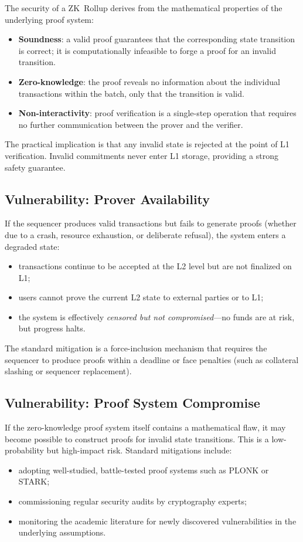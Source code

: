 The security of a ZK~Rollup derives from the mathematical properties of the underlying proof system:
\begin{itemize}
    \item \textbf{Soundness}: a valid proof guarantees that the corresponding state transition is correct; it is computationally infeasible to forge a proof for an invalid transition.
    \item \textbf{Zero-knowledge}: the proof reveals no information about the individual transactions within the batch, only that the transition is valid.
    \item \textbf{Non-interactivity}: proof verification is a single-step operation that requires no further communication between the prover and the verifier.
\end{itemize}

The practical implication is that any invalid state is rejected at the point of L1 verification. Invalid commitments never enter L1 storage, providing a strong safety guarantee.

\subsection{Vulnerability: Prover Availability}

If the sequencer produces valid transactions but fails to generate proofs (whether due to a crash, resource exhaustion, or deliberate refusal), the system enters a degraded state:
\begin{itemize}
    \item transactions continue to be accepted at the L2 level but are not finalized on L1;
    \item users cannot prove the current L2 state to external parties or to L1;
    \item the system is effectively \textit{censored but not compromised}---no funds are at risk, but progress halts.
\end{itemize}

The standard mitigation is a force-inclusion mechanism that requires the sequencer to produce proofs within a deadline or face penalties (such as collateral slashing or sequencer replacement).

\subsection{Vulnerability: Proof System Compromise}

If the zero-knowledge proof system itself contains a mathematical flaw, it may become possible to construct proofs for invalid state transitions. This is a low-probability but high-impact risk. Standard mitigations include:
\begin{itemize}
    \item adopting well-studied, battle-tested proof systems such as PLONK or STARK;
    \item commissioning regular security audits by cryptography experts;
    \item monitoring the academic literature for newly discovered vulnerabilities in the underlying assumptions.
\end{itemize}

